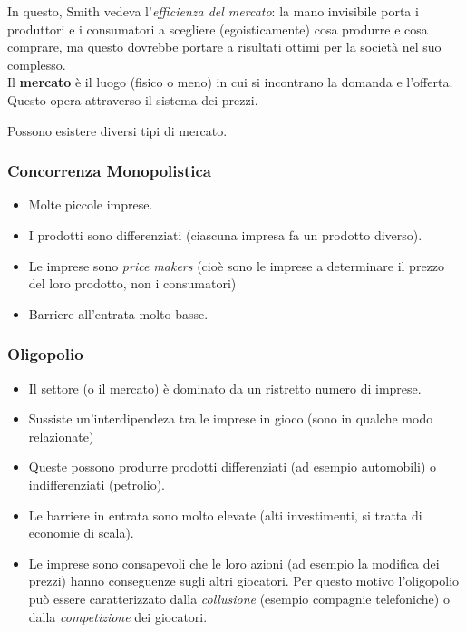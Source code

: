 \documentclass[a4paper,portrait,12pt]{article}
\theoremstyle{definition}
\begin{document}
In questo, Smith vedeva l'\emph{efficienza del mercato}: la mano invisibile porta i produttori e i consumatori a scegliere (egoisticamente) cosa produrre e cosa comprare, ma questo dovrebbe portare a risultati ottimi per la società nel suo complesso.\\

Il \textbf{mercato} è il luogo (fisico o meno) in cui si incontrano la domanda e l'offerta.
Questo opera attraverso il sistema dei prezzi.

Possono esistere diversi tipi di mercato.

\subsubsection{Concorrenza Monopolistica}
\begin{itemize}
\item Molte piccole imprese.
\item I prodotti sono differenziati (ciascuna impresa fa un prodotto diverso).
\item Le imprese sono \emph{price makers} (cioè sono le imprese a determinare il prezzo del loro prodotto, non i consumatori)
\item Barriere all'entrata molto basse.
\end{itemize}

\subsubsection{Oligopolio}
\begin{itemize}
\item Il settore (o il mercato) è dominato da un ristretto numero di imprese.
\item Sussiste un'interdipendeza tra le imprese in gioco (sono in qualche modo relazionate)
\item Queste possono produrre prodotti differenziati (ad esempio automobili) o indifferenziati (petrolio).
\item Le barriere in entrata sono molto elevate (alti investimenti, si tratta di economie di scala).
\item Le imprese sono consapevoli che le loro azioni (ad esempio la modifica dei prezzi) hanno conseguenze sugli altri giocatori.
Per questo motivo l'oligopolio può essere caratterizzato dalla \emph{collusione} (esempio compagnie telefoniche) o dalla \emph{competizione} dei giocatori.
\end{itemize}
\end{document}
